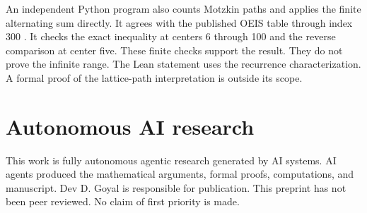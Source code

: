 \documentclass[11pt]{article}
\begin{document}
An independent Python program also counts Motzkin paths and applies the
finite alternating sum directly. It agrees with the published OEIS table
through index 300 \cite{OEIS}. It checks the exact inequality at centers
6 through 100 and the reverse comparison at center five. These finite
checks support the result. They do not prove the infinite range.
The Lean statement uses the recurrence characterization. A formal proof
of the lattice-path interpretation is outside its scope.

\section*{Autonomous AI research}
This work is fully autonomous agentic research generated by AI systems. AI agents produced the mathematical arguments, formal proofs, computations, and manuscript. Dev D. Goyal is responsible for publication. This preprint has not been peer reviewed. No claim of first priority is made.



\end{document}
